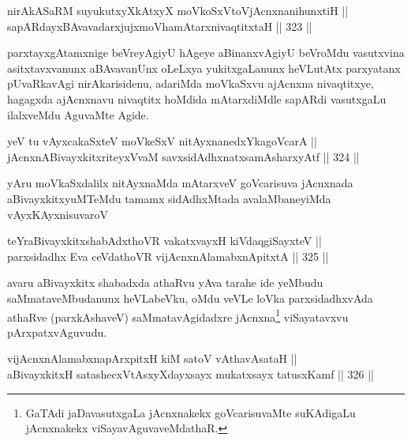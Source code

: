 \begin{shl}
nirAkASaRM suyukutxyXkAtxyX moVkoSxV\s toV\s jAcnxnanihunxtiH || \\
sapARdayxBAvavadarxjujxmoVhamAtarxnivaqtitxtaH \hfill || 323 ||  
\end{shl}

\begin{artha}
parxtayxgAtamxnige beVreyAgiyU hAgeye aBinanxvAgiyU beVroMdu
vasutxvina asitxtavxvanunx aBAvavanUnx oLeLxya yukitxgaLanunx
heVLutAtx parxyatanx pUvaRkavAgi nirAkarisidenu, adariMda moVkaSxvu
ajAcnxna nivaqtitxye, hagagxda ajAcnxnavu nivaqtitx hoMdida
mAtarxdiMdle sapARdi vasutxgaLu ilalxveMdu AguvaMte Agide.
\end{artha}


\begin{shl}
yeV tu vAyxcakaSxteV moVkeSxV nitAyxnanedxYkagoVcarA || \\
jAcnxnABivayxkitxriteyxVvaM savxsidAdhxnatxsamAsharxyAtf \hfill || 324 ||  
\end{shl}

\begin{artha}
yAru moVkaSxdalilx nitAyxnaMda mAtarxveV goVcarisuva jAcnxnada
aBivayxkitxyuMTeMdu tamamx sidAdhxMtada avalaMbaneyiMda vAyxKAyxnisuvaroV
\end{artha}

\begin{shl}
teYraBivayxkitxshabAdxthoVR vakatxvayxH kiVdaqgiSayxteV || \\
parxsidadhx Eva ceVdathoVR vijAcnxnAlamabxnApitxtA \hfill || 325 ||  
\end{shl}

\begin{artha}
avaru aBivayxkitx shabadxda athaRvu yAva tarahe ide yeMbudu
saMmataveMbudanunx heVLabeVku, oMdu veVLe loVka parxsidadhxvAda
athaRve (parxkAshaveV) saMmatavAgidadxre jAcnxna\footnote{GaTAdi
jaDavasutxgaLa jAcnxnakekx goVcarisuvaMte suKAdigaLu jAcnxnakekx
viSayavAguvaveMdathaR.} viSayatavxvu pArxpatxvAguvudu.
\end{artha}


\begin{shl}
\footnotemark[1]vijAcnxnAlamabxnapArxpitxH kiM satoV vA\s thavA\s sataH || \\
aBivayxkitxH satashecxVtAsxyXdayxsayx mukatxsayx tatusxKamf \hfill || 326 ||  
\end{shl}

